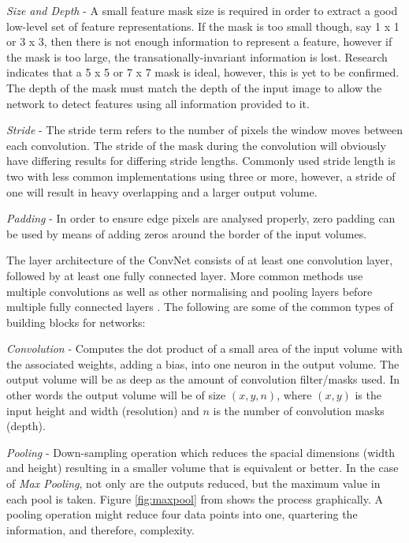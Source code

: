 \documentclass[fleqn,twoside]{article}
\begin{document}
\textit{Size and Depth} - A small feature mask size is required in order to extract a good low-level set of feature representations. If the mask is too small though, say 1 x 1 or 3 x 3, then there is not enough information to represent a feature, however if the mask is too large, the transationally-invariant information is lost. Research indicates that a 5 x 5 or 7 x 7 mask is ideal, however, this is yet to be confirmed. The depth of the mask must match the depth of the input image to allow the network to detect features using all information provided to it.

\textit{Stride} - The stride term refers to the number of pixels the window moves between each convolution. The stride of the mask during the convolution will obviously have differing results for differing stride lengths. Commonly used stride length is two with less common implementations using three or more, however, a stride of one will result in heavy overlapping and a larger output volume.

\textit{Padding} - In order to ensure edge pixels are analysed properly, zero padding can be used by means of adding zeros around the border of the input volumes.  

The layer architecture of the ConvNet consists of at least one convolution layer, followed by at least one fully connected layer. More common methods use multiple convolutions as well as other normalising and pooling layers before multiple fully connected layers \cite{krizhevsky,ciresan}. The following are some of the common types of building blocks for networks: 

\textit{Convolution} - Computes the dot product of a small area of the input volume with the associated weights, adding a bias, into one neuron in the output volume. The output volume will be as deep as the amount of convolution filter/masks used. In other words the output volume will be of size $(x,y,n)$, where $(x,y)$ is the input height and width (resolution) and $n$ is the number of convolution masks (depth).

\textit{Pooling} - Down-sampling operation which reduces the spacial dimensions (width and height) resulting in a smaller volume that is equivalent or better. In the case of \textit{Max Pooling}, not only are the outputs reduced, but the maximum value in each pool is taken. Figure \ref{fig:maxpool} from \cite{andrej}shows the process graphically. A pooling operation might reduce four data points into one, quartering the information, and therefore, complexity.
\end{document}
